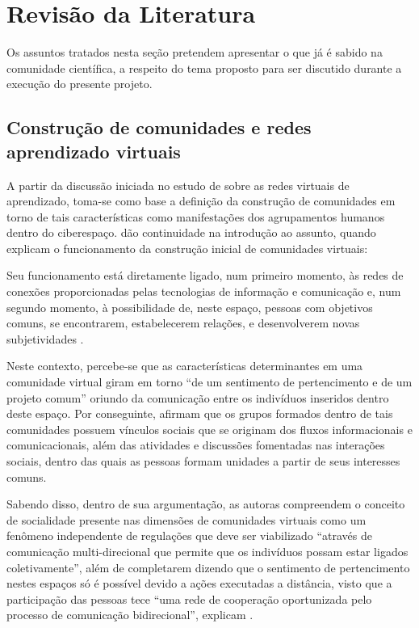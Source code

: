 \chapter{Revisão da Literatura}
Os assuntos tratados nesta seção pretendem apresentar o que já é sabido na comunidade científica, a respeito do tema proposto para ser discutido durante a execução do presente projeto. 
\section{Construção de comunidades e redes aprendizado virtuais}

A partir da discussão iniciada no estudo de  sobre as redes virtuais de aprendizado, toma-se como base a definição da construção de comunidades em torno de tais características como manifestações dos agrupamentos humanos dentro do ciberespaço.  dão continuidade na introdução ao assunto, quando explicam o funcionamento da construção inicial de comunidades virtuais:
\begin{citacao}

Seu funcionamento está diretamente ligado, num primeiro momento, às redes de conexões proporcionadas pelas tecnologias de informação e comunicação e, num segundo momento, à possibilidade de, neste espaço, pessoas com objetivos comuns, se encontrarem, estabelecerem relações, e desenvolverem novas subjetividades \cite{sartori2004comunidades}.

\end{citacao}

Neste contexto, percebe-se que as características determinantes em uma comunidade virtual giram em torno ``de um sentimento de pertencimento e de um projeto comum'' oriundo da comunicação entre os indivíduos inseridos dentro deste espaço. Por conseguinte,  afirmam que os grupos formados dentro de tais comunidades possuem vínculos sociais que se originam dos fluxos informacionais e comunicacionais, além das atividades e discussões fomentadas nas interações sociais, dentro das quais as pessoas formam unidades a partir de seus interesses comuns. 

Sabendo disso, dentro de sua argumentação, as autoras compreendem o conceito de socialidade presente nas dimensões de comunidades virtuais como um fenômeno independente de regulações que deve ser viabilizado ``através de comunicação multi-direcional que permite que os indivíduos possam estar ligados coletivamente'', além de completarem dizendo que o sentimento de pertencimento nestes espaços só é possível devido a ações executadas a distância, visto que a participação das pessoas tece “uma rede de cooperação oportunizada pelo processo de comunicação bidirecional'', explicam .

